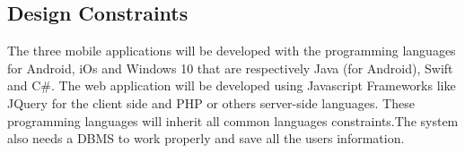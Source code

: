 \subsection{Design Constraints}
The three mobile applications will be developed with the programming languages for Android, iOs and Windows 10 that are respectively Java (for Android), Swift and C\#. The web application will be developed using Javascript Frameworks like JQuery for the client side and PHP or others server-side languages.
These programming languages will inherit all common languages constraints.The system also needs a DBMS to work properly and save all the users information.